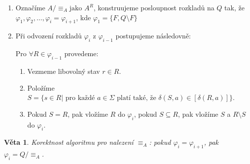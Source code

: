 \documentclass[10pt,a4paper]{article}
\theoremstyle{note}
\newtheorem{veta}{Věta}
\begin{document}
\begin{enumerate}
\item
Označ\'ime $A/ \equiv_{A} \text{jako } A^{R}$, konstruujeme posloupnost rozkladů na $Q$ tak, že $\varphi_{1}, \varphi_{2}, \ldots, \varphi_{i} = \varphi_{i+1}$,
kde $\varphi_{1} = \lbrace F, Q \setminus F \rbrace$

\item
Při odvozen\'i rozkladů $\varphi_{i}$ z $\varphi_{i-1}$ postupujeme n\'asledovně:

Pro $\forall R \in \varphi_{i-1}$ provedeme:
\begin{enumerate}
\item
Vezmeme libovoln\'y stav $r \in R$.

\item
Polož\'ime $S = \lbrace s \in R | \text{ pro každ\'e } a \in \Sigma \text{ plat\'i tak\'e, že }\delta(S, a) \in [\delta(R, a)] \rbrace$.

\item
Pokud $S = R$, pak vlož\'ime $R$ do $\varphi_{i}$, pokud $S \subseteq R$, pak vlož\'ime $S$ a $R \setminus S$ do $\varphi_{i}$.
\end{enumerate}
\end{enumerate}

\begin{veta}
Korektnost algoritmu pro nalezen\'i $\equiv_{A}$: pokud $\varphi_{i} = \varphi_{i+1}$, pak $\varphi_{i} = Q/ \equiv_{A}$.
\end{veta}
\end{document}
